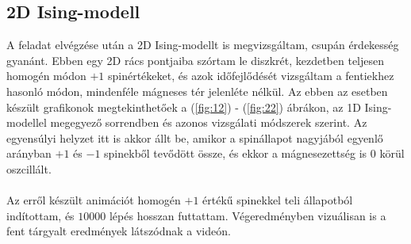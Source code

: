 \subsection{2D Ising-modell}
A feladat elvégzése után a 2D Ising-modellt is megvizsgáltam, csupán érdekesség gyanánt. Ebben egy 2D rács pontjaiba szórtam le diszkrét, kezdetben teljesen homogén módon $+1$ spinértékeket, és azok időfejlődését vizsgáltam a fentiekhez hasonló módon, mindenféle mágneses tér jelenléte nélkül. Az ebben az esetben készült grafikonok megtekinthetőek a (\ref{fig:12}) - (\ref{fig:22}) ábrákon, az 1D Ising-modellel megegyező sorrendben és azonos vizsgálati módszerek szerint. Az egyensúlyi helyzet itt is akkor állt be, amikor a spinállapot nagyjából egyenlő arányban $+1$ és $-1$ spinekből tevődött össze, és ekkor a mágnesezettség is $0$ körül oszcillált.
\\ \\
Az erről készült animációt\cite{yt} homogén $+1$ értékű spinekkel teli állapotból indítottam, és $10000$ lépés hosszan futtattam. Végeredményben vizuálisan is a fent tárgyalt eredmények látszódnak a videón.